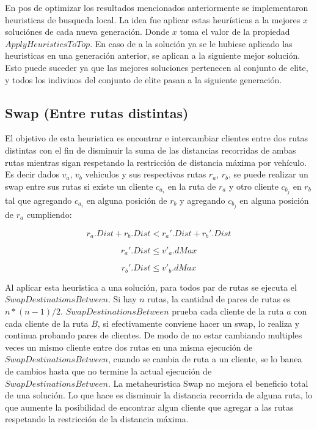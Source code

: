 En pos de optimizar los resultados mencionados anteriormente se implementaron heuristicas de busqueda local. La idea fue aplicar estas heurísticas a la mejores $x$ soluciónes de cada nueva generación. Donde $x$ toma el valor de la propiedad $ApplyHeuristicsToTop$. En caso de a la solución ya se le hubiese aplicado las heuristicas en una generación anterior, se aplican a la siguiente mejor solución. Esto puede suceder ya que las mejores soluciones pertenecen al conjunto de elite, y todos los indiviuos del conjunto de elite pasan a la siguiente generación.

\subsection{Swap (Entre rutas distintas)}

El objetivo de esta heuristica es encontrar e intercambiar clientes entre dos rutas distintas con el fin de disminuir la suma de las distancias recorridas de ambas rutas mientras sigan respetando la restricción de distancia máxima por vehículo. Es decir dados $v_a$, $v_b$ vehiculos y sus respectivas rutas $r_a$, $r_b$, se puede realizar un swap entre sus rutas si existe un cliente $c_{a_i}$ en la ruta de $r_a$ y otro cliente $c_{b_j}$ en $r_b$ tal que agregando $c_{a_i}$ en alguna posición de $r_b$ y agregando $c_{b_j}$ en alguna posición de $r_a$ cumpliendo:

\begin{equation*}
r_a.Dist + r_b.Dist < r_a'.Dist + r_b'.Dist \nonumber
\end{equation*}

\begin{equation*}
r_a'.Dist \leq v'_a.dMax
\end{equation*}

\begin{equation*}
r_b'.Dist \leq v'_b.dMax
\end{equation*}

Al aplicar esta heuristica a una solución, para todos par de rutas se ejecuta el $SwapDestinationsBetween$. Si hay $n$ rutas, la cantidad de pares de rutas es $n * (n-1) / 2$. $SwapDestinationsBetween$ prueba cada cliente de la ruta $a$ con cada cliente de la ruta $B$, si efectivamente conviene hacer un swap, lo realiza y continua probando pares de clientes. De modo de no estar cambiando multiples veces un mismo cliente entre dos rutas en una misma ejecución de $SwapDestinationsBetween$, cuando se cambia de ruta a un cliente, se lo banea de cambios hasta que no termine la actual ejecución de $SwapDestinationsBetween$. La metaheuristica Swap no mejora el beneficio total de una solución. Lo que hace es disminuir la distancia recorrida de alguna ruta, lo que aumente la posibilidad de encontrar algun cliente que agregar a las rutas respetando la restricción de la distancia máxima.

